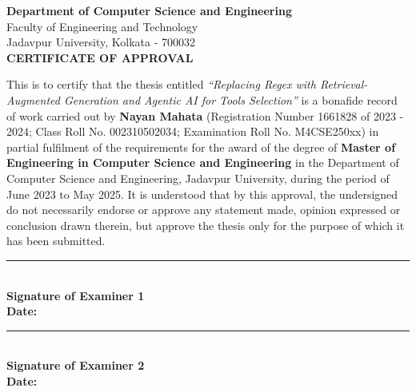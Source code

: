 

\thispagestyle{empty}

    
\begin{center}
    \large \textbf{Department of Computer Science and Engineering} \\
    \large Faculty of Engineering and Technology \\
    \large Jadavpur University, Kolkata - 700032 \\

    \vspace{1cm}
    \LARGE \textbf{CERTIFICATE OF APPROVAL}
\end{center}

\vspace{1cm}


\noindent
This is to certify that the thesis entitled \textit{``Replacing Regex with Retrieval-Augmented Generation and Agentic AI for Tools Selection''} is a bonafide record of work carried out by \textbf{Nayan Mahata} (Registration Number 1661828 of 2023 - 2024; Class Roll No. 002310502034; Examination Roll No. M4CSE250xx) in partial fulfilment of the requirements for the award of the degree of \textbf{Master of Engineering in Computer Science and Engineering} in the Department of Computer Science and Engineering, Jadavpur University, during the period of June 2023 to May 2025. It is understood that by this approval, the undersigned do not necessarily endorse or approve any statement made, opinion expressed or conclusion drawn therein, but approve the thesis only for the purpose of which it has been submitted.



\vspace{4cm}

\noindent \rule[0.10ex]{5cm}{0.4pt} \\
\noindent
\textbf{Signature of Examiner 1} \\
\hfill \textbf{Date:} \\

\vspace{1.5cm}

\noindent \rule[0.10ex]{5cm}{0.4pt} \\
\noindent
\textbf{Signature of Examiner 2} \\
\hfill \textbf{Date:} \\


